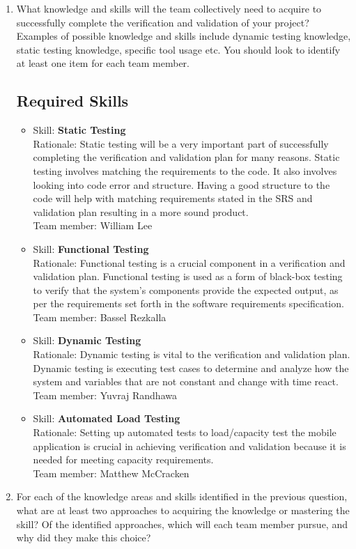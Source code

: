 \documentclass[12pt, titlepage]{article}
\begin{document}
	\begin{enumerate}
		\item What knowledge and skills will the team collectively need to acquire to
		successfully complete the verification and validation of your project?
		Examples of possible knowledge and skills include dynamic testing knowledge,
		static testing knowledge, specific tool usage etc.  You should look to
		identify at least one item for each team member.
		\subsection{Required Skills}
		\begin{itemize}
			\item Skill: \textbf{Static Testing}
			\\ Rationale: Static testing will be a very important part of successfully completing the verification and validation plan for many reasons. Static testing involves matching the requirements to the code. It also involves looking into code error and structure. Having a good structure to the code will help with matching requirements stated in the SRS and validation plan resulting in a more sound product.
			\\ Team member: William Lee
			
			\item Skill: \textbf{Functional Testing}
			\\ Rationale: Functional testing is a crucial component in a verification and validation plan. Functional testing is used as a form of black-box testing to verify that the system's components provide the expected output, as per the requirements set forth in the software requirements specification.
			\\ Team member: Bassel Rezkalla

			\item Skill: \textbf{Dynamic Testing}
			\\ Rationale: Dynamic testing is vital to the verification and validation plan. Dynamic testing is executing test cases to determine and analyze how the system and variables that are not constant and change with time react.
			\\ Team member: Yuvraj Randhawa

			\item Skill: \textbf{Automated Load Testing}
			\\ Rationale: Setting up automated tests to load/capacity test the mobile application is crucial in achieving verification and validation because it is needed for meeting capacity requirements.
			\\ Team member: Matthew McCracken
		\end{itemize}
		\item For each of the knowledge areas and skills identified in the previous
		question, what are at least two approaches to acquiring the knowledge or
		mastering the skill?  Of the identified approaches, which will each team
		member pursue, and why did they make this choice?

\end{enumerate}
\end{document}
